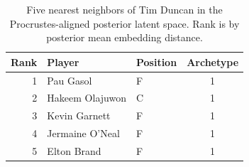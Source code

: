 \begin{table}[htbp]
  \centering\small
  \begin{tabular}{rllc}
    \toprule
    Rank & Player & Position & Archetype \\
    \midrule
    1 & Pau Gasol & F & 1 \\
    2 & Hakeem Olajuwon & C & 1 \\
    3 & Kevin Garnett & F & 1 \\
    4 & Jermaine O'Neal & F & 1 \\
    5 & Elton Brand & F & 1 \\
    \bottomrule
  \end{tabular}
  \caption{Five nearest neighbors of Tim Duncan in the Procrustes-aligned posterior latent space. Rank is by posterior mean embedding distance.}
  \label{tab:Tim_Duncan_neighbors}
\end{table}

